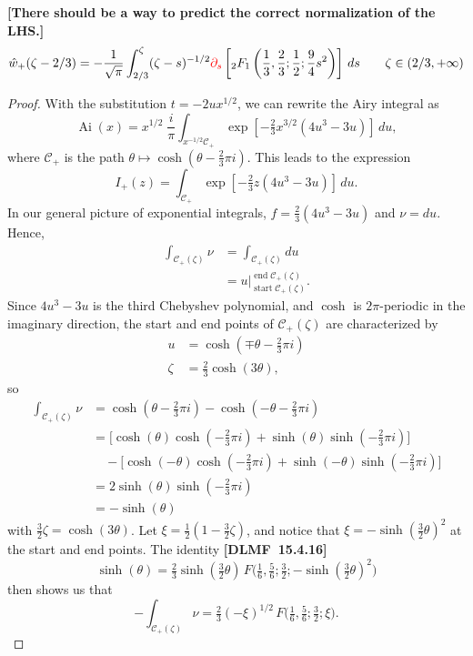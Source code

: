 \documentclass[11pt,a4paper,twoside,leqno,noamsfonts]{amsart}
\numberwithin{equation}{section}
\DeclareMathOperator{\Ai}{Ai}
\begin{document}
\begin{example}[Airy]
\begin{claim}\label{claim 2}
\textbf{[There should be a way to predict the correct normalization of the LHS.]}
\begin{equation}
\hat{w}_+(\zeta-2/3)=-\frac{1}{\sqrt{\pi}}\int_{2/3}^{\zeta}(\zeta-s)^{-1/2}\textcolor{red}{\partial_s} \left[{}_2F_1\left(\frac{1}{3},\frac{2}{3};\frac{1}{2};\frac{9}{4}s^2\right)\right]\,ds \qquad \zeta\in(2/3,+\infty)
\end{equation}
\end{claim}
\begin{proof}
With the substitution $t = -2ux^{1/2}$, we can rewrite the Airy integral as
\[ \Ai(x) = x^{1/2}\;\frac{i}{\pi} \int_{x^{-1/2} \mathcal{C}_+} \exp\left[-\tfrac{2}{3}x^{3/2} \left(4u^3 - 3u\right)\right]\,du, \]
where $\mathcal{C}_+$ is the path $\theta \mapsto \cosh(\theta - \tfrac{2}{3}\pi i)$. This leads to the expression
\[ I_+(z) = \int_{\mathcal{C}_+} \exp\left[-\tfrac{2}{3} z \left(4u^3 - 3u\right)\right]\,du. \]
In our general picture of exponential integrals, $f = \tfrac{2}{3}(4u^3 - 3u)$ and $\nu = du$. Hence,
\begin{align*}
\int_{\mathcal{C}_+(\zeta)} \nu & = \int_{\mathcal{C}_+(\zeta)} du \\
& = u \Big|_{\operatorname{start} \mathcal{C}_+(\zeta)}^{\operatorname{end} \mathcal{C}_+(\zeta)}.
\end{align*}
Since $4u^3 - 3u$ is the third Chebyshev polynomial, and $\cosh$ is $2\pi$-periodic in the imaginary direction, the start and end points of $\mathcal{C}_+(\zeta)$ are characterized by
\begin{align*}
u & = \cosh(\mp\theta - \tfrac{2}{3}\pi i) \\
\zeta & = \tfrac{2}{3} \cosh(3\theta),
\end{align*}
so
\begin{align*}
\int_{\mathcal{C}_+(\zeta)} \nu & = \cosh(\theta - \tfrac{2}{3}\pi i) - \cosh(-\theta - \tfrac{2}{3}\pi i) \\
& = \big[\cosh(\theta) \cosh(-\tfrac{2}{3}\pi i) + \sinh(\theta) \sinh(-\tfrac{2}{3}\pi i)\big] \\
& \quad - \big[\cosh(-\theta) \cosh(-\tfrac{2}{3}\pi i) + \sinh(-\theta) \sinh(-\tfrac{2}{3}\pi i)\big] \\
& = 2\sinh(\theta) \sinh(-\tfrac{2}{3}\pi i) \\
& = -\sinh(\theta)
\end{align*}
with $\tfrac{3}{2} \zeta = \cosh(3\theta)$. Let $\xi = \tfrac{1}{2}(1 - \tfrac{3}{2}\zeta)$, and notice that $\xi = -\sinh(\tfrac{3}{2} \theta)^2$ at the start and end points. The identity \textbf{[DLMF~15.4.16]}
\[ \sinh(\theta) = \tfrac{2}{3} \sinh(\tfrac{3}{2} \theta)\,F\big(\tfrac{1}{6}, \tfrac{5}{6}; \tfrac{3}{2}; -\sinh(\tfrac{3}{2} \theta)^2\big) \]
then shows us that
\[ -\int_{\mathcal{C}_+(\zeta)} \nu = \tfrac{2}{3} (-\xi)^{1/2}\,F\big(\tfrac{1}{6}, \tfrac{5}{6}; \tfrac{3}{2}; \xi\big). \]


\end{proof}
\end{example}
\end{document}
